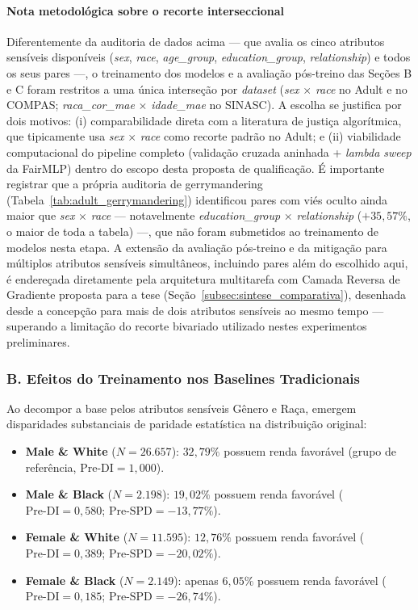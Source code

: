 \paragraph{Nota metodológica sobre o recorte interseccional}
Diferentemente da auditoria de dados acima --- que avalia os cinco atributos sensíveis disponíveis (\textit{sex}, \textit{race}, \textit{age\_group}, \textit{education\_group}, \textit{relationship}) e todos os seus pares ---, o treinamento dos modelos e a avaliação pós-treino das Seções B e C foram restritos a uma única interseção por \textit{dataset} (\textit{sex} $\times$ \textit{race} no Adult e no COMPAS; \textit{raca\_cor\_mae} $\times$ \textit{idade\_mae} no SINASC). A escolha se justifica por dois motivos: (i) comparabilidade direta com a literatura de justiça algorítmica, que tipicamente usa \textit{sex} $\times$ \textit{race} como recorte padrão no Adult; e (ii) viabilidade computacional do pipeline completo (validação cruzada aninhada + \textit{lambda sweep} da FairMLP) dentro do escopo desta proposta de qualificação. É importante registrar que a própria auditoria de gerrymandering (Tabela~\ref{tab:adult_gerrymandering}) identificou pares com viés oculto ainda maior que \textit{sex} $\times$ \textit{race} --- notavelmente \textit{education\_group} $\times$ \textit{relationship} ($+35,57\%$, o maior de toda a tabela) ---, que não foram submetidos ao treinamento de modelos nesta etapa. A extensão da avaliação pós-treino e da mitigação para múltiplos atributos sensíveis simultâneos, incluindo pares além do escolhido aqui, é endereçada diretamente pela arquitetura multitarefa com Camada Reversa de Gradiente proposta para a tese (Seção~\ref{subsec:sintese_comparativa}), desenhada desde a concepção para mais de dois atributos sensíveis ao mesmo tempo --- superando a limitação do recorte bivariado utilizado nestes experimentos preliminares.

\subsubsection{B. Efeitos do Treinamento nos Baselines Tradicionais}

Ao decompor a base pelos atributos sensíveis Gênero e Raça, emergem disparidades substanciais de paridade estatística na distribuição original:
\begin{itemize}
    \item \textbf{Male \& White} ($N = 26.657$): $32,79\%$ possuem renda favorável (grupo de referência, $\text{Pre-DI} = 1,000$).
    \item \textbf{Male \& Black} ($N = 2.198$): $19,02\%$ possuem renda favorável ($\text{Pre-DI} = 0,580$; $\text{Pre-SPD} = -13,77\%$).
    \item \textbf{Female \& White} ($N = 11.595$): $12,76\%$ possuem renda favorável ($\text{Pre-DI} = 0,389$; $\text{Pre-SPD} = -20,02\%$).
    \item \textbf{Female \& Black} ($N = 2.149$): apenas $6,05\%$ possuem renda favorável ($\text{Pre-DI} = 0,185$; $\text{Pre-SPD} = -26,74\%$).
\end{itemize}

